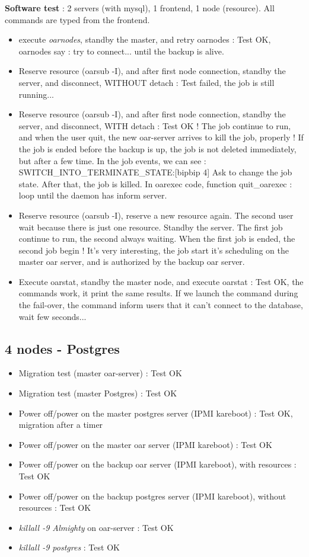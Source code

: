 \documentclass[a4paper,10pt]{report}
\begin{document}
\textbf{Software test} : 2 servers (with mysql), 1 frontend, 1 node (resource). All commands are typed from the frontend.
\begin{itemize}
 \item execute \textit{oarnodes}, standby the master, and retry oarnodes : Test OK, oarnodes say : try to connect... until the backup is alive.
 \item Reserve resource (oarsub -I), and after first node connection, standby the server, and disconnect, WITHOUT detach : Test failed, the job is still running...
 \item Reserve resource (oarsub -I), and after first node connection, standby the server, and disconnect, WITH detach : Test OK ! The job continue to run, and when the user quit, the new oar-server arrives to kill the job, properly !
If the job is ended before the backup is up, the job is not deleted immediately, but after a few time. In the job events, we  can see : SWITCH\_INTO\_TERMINATE\_STATE:[bipbip 4] Ask to change the job state. After that, the job is killed.
In oarexec code, function quit\_oarexec : loop until the daemon has inform server.
 \item Reserve resource (oarsub -I), reserve a new resource again. The second user wait because there is just one resource. Standby the server. The first job continue to run, the second always waiting. When the first job is ended, the second job begin ! It's very interesting, the job start it's scheduling on the master oar server, and is authorized  by the backup oar server.
 \item Execute oarstat, standby the master node, and execute oarstat : Test OK, the commands work, it print the same results. If we launch the command during the fail-over, the command inform users that it can't connect to the database, wait few seconds...
\end{itemize}


\subsection{4 nodes - Postgres}
\begin{itemize}
 \item Migration test (master oar-server) : Test OK
 \item Migration test (master Postgres) : Test OK
 \item Power off/power on the master postgres server (IPMI kareboot) : Test OK, migration after a timer
 \item Power off/power on the master oar server (IPMI kareboot) : Test OK
 \item Power off/power on the backup oar server (IPMI kareboot), with resources : Test OK
 \item Power off/power on the backup postgres server (IPMI kareboot), without resources : Test OK
 \item \textit{killall -9 Almighty} on oar-server : Test OK
 \item \textit{killall -9 postgres} : Test OK
\end{itemize}
\end{document}
